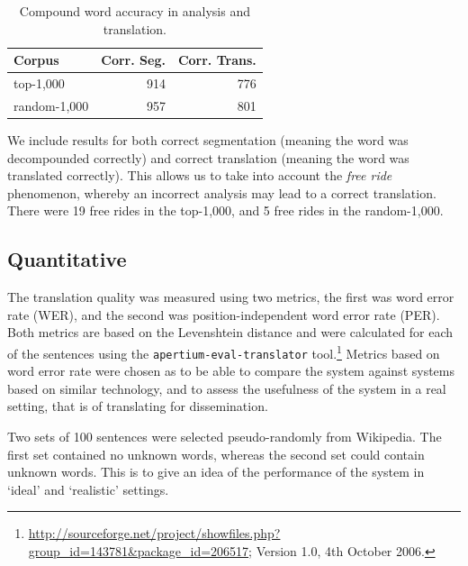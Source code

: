 \documentclass[11pt]{article}
\begin{document}
\begin{table}
  \begin{center}
  \begin{tabular}{|l|r|r|}
   \hline
   {\bf Corpus}    & {\bf Corr. Seg.}    & {\bf Corr. Trans.}\\
   \hline
   top-1,000       & 914                 &  776 \\ 
   \hline
   random-1,000    & 957                 &  801 \\ 
   \hline
  \end{tabular}
    \caption{Compound word accuracy in analysis and translation.}
    \label{table:compounds}
  \end{center}
\end{table}

We include results for both correct segmentation (meaning the word was decompounded 
correctly) and correct translation (meaning the word was translated correctly). This allows
us to take into account the {\em free ride} phenomenon, whereby an incorrect analysis
may lead to a correct translation. There were 19 free rides in the top-1,000, and 5 free 
rides in the random-1,000.

\subsection{Quantitative}

The translation quality was measured using two metrics, the first was word error rate (WER), and the 
second was position-independent word error rate (PER). Both metrics are based on the Levenshtein 
distance \cite{Levenshtein:65} and were calculated for each of the sentences using the 
{\small \texttt{apertium-eval-translator}} tool.\footnote{\url{http://sourceforge.net/project/showfiles.php?group_id=143781&package_id=206517}; Version 1.0, 4th October 2006.} Metrics based on word error rate were chosen as to be able to compare 
the system against systems based on similar technology, and to assess the usefulness of the 
system in a real setting, that is of translating for dissemination. 

Two sets of 100 sentences were selected pseudo-randomly from Wikipedia. The first set contained 
no unknown words, whereas the second set could contain unknown words. This is to give an idea
of the performance of the system in `ideal' and `realistic' settings.
\end{document}

